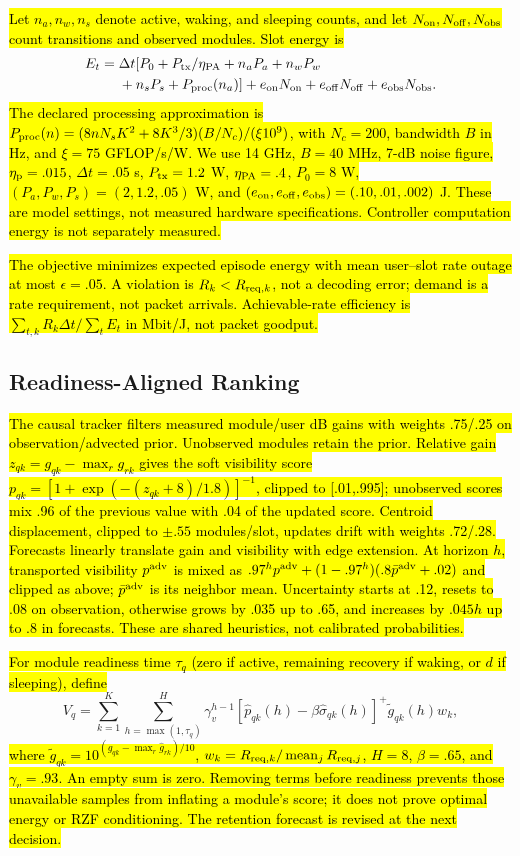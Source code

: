 \documentclass[letterpaper,conference]{IEEEtran}
\newcommand{\rev}[1]{\hl{#1}}
\newcommand{\rev}[1]{\hl{#1}}
\begin{document}
\rev{Let $n_a,n_w,n_s$ denote active, waking, and sleeping counts, and let $N_{\rm on},N_{\rm off},N_{\rm obs}$ count transitions and observed modules. Slot energy is}
\begin{align}
E_t={}&\Delta t[P_0+P_{\rm tx}/\eta_{\rm PA}+n_aP_a+n_wP_w\notag\\
&+n_sP_s+P_{\rm proc}(n_a)]
+e_{\rm on}N_{\rm on}+e_{\rm off}N_{\rm off}+e_{\rm obs}N_{\rm obs}.
\end{align}
\rev{The declared processing approximation is $P_{\rm proc}(n)=(8nN_sK^2+8K^3/3)(B/N_c)/(\xi10^9)$, with $N_c=200$, bandwidth $B$ in Hz, and $\xi=75$ GFLOP/s/W. We use 14 GHz, $B=40$ MHz, 7-dB noise figure, $\eta_{\rm p}=.015$, $\Delta t=.05$ s, $P_{\rm tx}=1.2$ W, $\eta_{\rm PA}=.4$, $P_0=8$ W, $(P_a,P_w,P_s)=(2,1.2,.05)$ W, and $(e_{\rm on},e_{\rm off},e_{\rm obs})=(.10,.01,.002)$ J. These are model settings, not measured hardware specifications. Controller computation energy is not separately measured.}

\rev{The objective minimizes expected episode energy with mean user--slot rate outage at most $\epsilon=.05$. A violation is $R_k<R_{{\rm req},k}$, not a decoding error; demand is a rate requirement, not packet arrivals. Achievable-rate efficiency is $\sum_{t,k}R_k\Delta t/\sum_tE_t$ in Mbit/J, not packet goodput.}

\subsection{Readiness-Aligned Ranking}
\rev{The causal tracker filters measured module/user dB gains with weights .75/.25 on observation/advected prior. Unobserved modules retain the prior. Relative gain $z_{qk}=g_{qk}-\max_r g_{rk}$ gives the soft visibility score $p_{qk}=[1+\exp(-(z_{qk}+8)/1.8)]^{-1}$, clipped to [.01,.995]; unobserved scores mix .96 of the previous value with .04 of the updated score. Centroid displacement, clipped to $\pm.55$ modules/slot, updates drift with weights .72/.28. Forecasts linearly translate gain and visibility with edge extension. At horizon $h$, transported visibility $p^{\rm adv}$ is mixed as $.97^hp^{\rm adv}+(1-.97^h)(.8\bar p^{\rm adv}+.02)$ and clipped as above; $\bar p^{\rm adv}$ is its neighbor mean. Uncertainty starts at .12, resets to .08 on observation, otherwise grows by .035 up to .65, and increases by $.045h$ up to .8 in forecasts. These are shared heuristics, not calibrated probabilities.}

\rev{For module readiness time $\tau_q$ (zero if active, remaining recovery if waking, or $d$ if sleeping), define}
\begin{equation}
V_q=\sum_{k=1}^{K}\sum_{h=\max(1,\tau_q)}^{H}
\gamma_v^{h-1}[\hat p_{qk}(h)-\beta\hat\sigma_{qk}(h)]^+
\tilde g_{qk}(h)w_k,
\label{eq:score}
\end{equation}
\rev{where $\tilde g_{qk}=10^{(\hat g_{qk}-\max_r\hat g_{rk})/10}$, $w_k=R_{{\rm req},k}/\operatorname{mean}_j R_{{\rm req},j}$, $H=8$, $\beta=.65$, and $\gamma_v=.93$. An empty sum is zero. Removing terms before readiness prevents those unavailable samples from inflating a module's score; it does not prove optimal energy or RZF conditioning. The retention forecast is revised at the next decision.}
\end{document}
